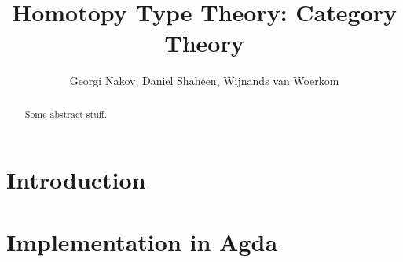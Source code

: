 \documentclass[12pt,a4paper]{article}
\title{Homotopy Type Theory: Category Theory}
\author{Georgi Nakov, Daniel Shaheen, Wijnands van Woerkom}
\date{}
\begin{document}
\maketitle

\begin{abstract}

Some abstract stuff. 

\end{abstract}

\vfill

\clearpage

\tableofcontents

\clearpage

\section{Introduction}



\section{Implementation in Agda}


\printbibliography
\end{document}
